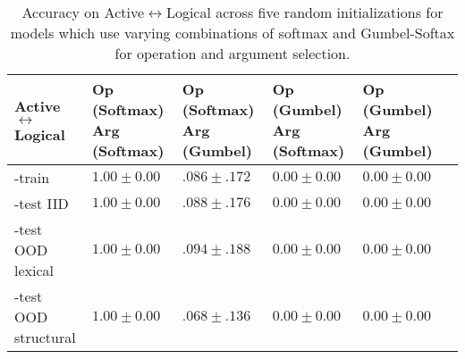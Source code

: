 \begin{table*}[h]
\begin{center}
\begin{sc}
\begin{tabular}{lp{7.5em}p{7.5em}p{7.5em}p{7.5em}p{0em}}
\toprule
Active$\leftrightarrow$Logical & \raggedright Op (Softmax) Arg (Softmax) & \raggedright Op (Softmax) Arg (Gumbel) & \raggedright Op (Gumbel) Arg (Softmax) & \raggedright Op (Gumbel) Arg (Gumbel) & \\
\midrule
-train & $1.00 \pm 0.00$ & $.086 \pm .172$ & $0.00 \pm 0.00$ & $0.00 \pm 0.00$ \\
-test IID & $1.00 \pm 0.00$ & $.088 \pm .176$ & $0.00 \pm 0.00$ & $0.00 \pm 0.00$ \\
-test OOD lexical & $1.00 \pm 0.00$ & $.094 \pm .188$ & $0.00 \pm 0.00$ & $0.00 \pm 0.00$ \\
-test OOD structural & $1.00 \pm 0.00$ & $.068 \pm .136$ & $0.00 \pm 0.00$ & $0.00 \pm 0.00$ \\
\bottomrule
\end{tabular}
\end{sc}
\end{center}
\vskip -0.1in
\caption{Accuracy on Active$\leftrightarrow$Logical across five random initializations for models which use varying combinations of softmax and Gumbel-Softax for operation and argument selection.}
\label{tab:gumbel}
\end{table*}



